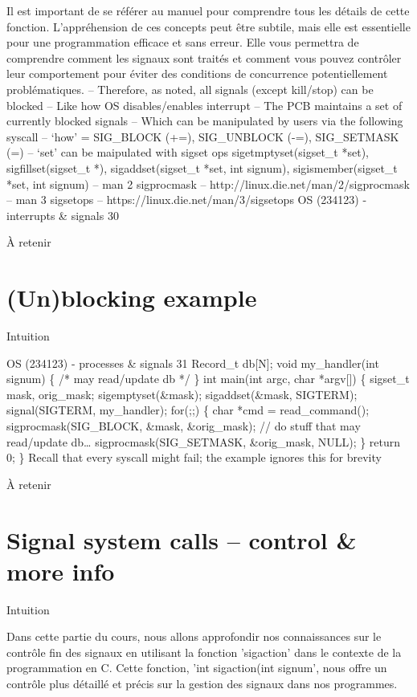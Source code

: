 \documentclass[12pt]{article}
\begin{document}
Il est important de se référer au manuel pour comprendre tous les détails de cette fonction. L'appréhension de ces concepts peut être subtile, mais elle est essentielle pour une programmation efficace et sans erreur. Elle vous permettra de comprendre comment les signaux sont traités et comment vous pouvez contrôler leur comportement pour éviter des conditions de concurrence potentiellement problématiques.
– Therefore, as noted, all signals (except kill/stop) can be blocked
– Like how OS disables/enables interrupt
– The PCB maintains a set of currently blocked signals
– Which can be manipulated by users via the following syscall
– ‘how’ = SIG\_BLOCK (+=), SIG\_UNBLOCK (-=), SIG\_SETMASK (=)
– ‘set’ can be maipulated with sigset ops sigetmptyset(sigset\_t *set),
sigfillset(sigset\_t *), sigaddset(sigset\_t *set, int signum),
sigismember(sigset\_t *set, int signum)
– man 2 sigprocmask – http://linux.die.net/man/2/sigprocmask
– man 3 sigsetops – https://linux.die.net/man/3/sigsetops
OS (234123) - interrupts \& signals
30
\begin{aretenir}{À retenir}
\end{aretenir}

\section{(Un)blocking example}
\begin{myvulga}{Intuition}
\end{myvulga}
OS (234123) - processes \& signals
31
Record\_t db[N];
void my\_handler(int signum) \{
/* may read/update db */
\}
int main(int argc, char *argv[])
\{
sigset\_t mask, orig\_mask;
sigemptyset(\&mask);
sigaddset(\&mask, SIGTERM);
signal(SIGTERM, my\_handler);
for(;;) \{
char *cmd = read\_command();
sigprocmask(SIG\_BLOCK, \&mask, \&orig\_mask);
// do stuff that may read/update db…
sigprocmask(SIG\_SETMASK, \&orig\_mask, NULL);
\}
return 0;
\}
Recall that every syscall might fail;
the example ignores this for brevity
\begin{aretenir}{À retenir}
\end{aretenir}

\section{Signal system calls – control \& more info}
\begin{myvulga}{Intuition}
\end{myvulga}
Dans cette partie du cours, nous allons approfondir nos connaissances sur le contrôle fin des signaux en utilisant la fonction 'sigaction' dans le contexte de la programmation en C. Cette fonction, 'int sigaction(int signum', nous offre un contrôle plus détaillé et précis sur la gestion des signaux dans nos programmes.
\end{document}

